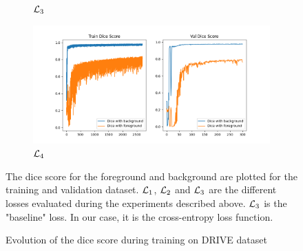 \begin{figure}[h!]
\begin{subfigure}{0.45\textwidth}
        \caption{$\mathcal{L}_{3}$}
    \end{subfigure}
    \begin{subfigure}{0.45\textwidth}
        \includegraphics[width=\textwidth]{figures/CEwBL_dice_coeff_training.png}
        \caption{$\mathcal{L}_{4}$}
    \end{subfigure}
    \caption{Evolution of the dice score during training on DRIVE dataset} The dice score for the foreground and background are plotted for the training and validation dataset. $\mathcal{L}_{1}$, $\mathcal{L}_2$ and $\mathcal{L}_3$ are the different losses evaluated during the experiments described above. $\mathcal{L}_3$ is the "baseline" loss. In our case, it is the cross-entropy loss function.
    \label{fig:dsc_train_drive}
\end{figure}
